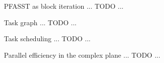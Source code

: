 \documentclass[11pt,aspectratio=43]{beamer}
\newcommand{\matr}[1]{\mathbf{#1}}
\newcommand{\vect}[1]{\boldsymbol{#1}}
\newcommand{\eyeMat}{\matr{I}}
\newcommand{\phiOp}{\bm{\phi}}
\newcommand{\chiOp}{\bm{\chi}}
\newcommand{\phiApprox}{\bm{\tilde{\phi}}}
\begin{document}
\begin{frame}{PFASST as block iteration}
	... TODO ...
\end{frame}

\begin{frame}{Task graph}
	... TODO ...
\end{frame}

\begin{frame}{Task scheduling}
	... TODO ...
\end{frame}

\begin{frame}{Parallel efficiency in the complex plane}
	... TODO ...
\end{frame}

\end{document}
